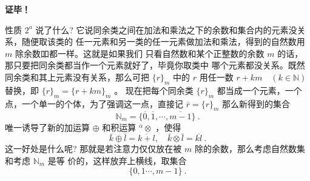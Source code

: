 \textbf{证毕！}

性质 $2^a$ 说了什么? 它说同余类之间在加法和乘法之下的余数和集合内的元素没关系，随便取该类的 任一元素和另一类的任一元素做加法和乘法，得到的自然数用 $m$ 除余数吅都一样。这就是如果我们 只看自然数和某个正整数的余数 $m$ 的话，那只要把同余类都当作一个元素就好了，毕竟你取类中 哪个元素都没关系。既然同余类和其上元素没有关系，那么可把 $\{r\}_m$ 中的 $r$ 用任一数 $r+k m \quad(k \in \mathbb{N})$ 替换，即 $\{r\}_m=\{r+k m\}_m$ 。
现在把每个同余类 $\{r\}_m$ 都当成一个元素，一个点，一个单一的个体，为了强调这一点，直接记 $\bar{r}=\{r\}_m$ 那么新得到的集合
$$
\mathbb{N}_m=\{\overline{0}, \overline{1}, \cdots, \overline{m-1}\}~.
$$
唯一诱导了新的加运算 $\oplus$ 和积运算 ${ }^\alpha \otimes$ ，使得
$$
\bar{k} \oplus \bar{l}=\overline{k+l}, \quad \bar{k} \otimes \bar{l}=\overline{k l}~.
$$
这一好处是什么呢? 那就是若注意力仅仅放在被 $m$ 除的余数，那么考虑自然数集和考虑 $\mathbb{N}_m$ 是等 价的，这样放弃上横线，取集合
$$
\{0,1 \cdots, m-1\}~.
$$